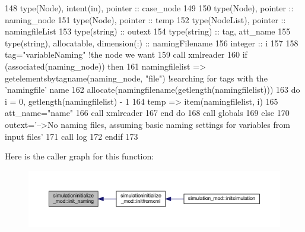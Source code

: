 \begin{DoxyCode}
148     \textcolor{keywordtype}{type}(Node), \textcolor{keywordtype}{intent(in)}, \textcolor{keywordtype}{pointer} :: case\_node
149 
150     \textcolor{keywordtype}{type}(Node), \textcolor{keywordtype}{pointer} :: naming\_node
151     \textcolor{keywordtype}{type}(Node), \textcolor{keywordtype}{pointer} :: temp
152     \textcolor{keywordtype}{type}(NodeList), \textcolor{keywordtype}{pointer} :: namingfileList
153     \textcolor{keywordtype}{type}(string) :: outext
154     \textcolor{keywordtype}{type}(string) :: tag, att\_name
155     \textcolor{keywordtype}{type}(string), \textcolor{keywordtype}{allocatable}, \textcolor{keywordtype}{dimension(:)} :: namingFilename
156     \textcolor{keywordtype}{integer} :: i
157 
158     tag=\textcolor{stringliteral}{"variableNaming"}    \textcolor{comment}{!the node we want}
159     \textcolor{keyword}{call }xmlreader%
160     \textcolor{keywordflow}{if} (\textcolor{keyword}{associated}(naming\_node)) \textcolor{keywordflow}{then}
161         namingfilelist => getelementsbytagname(naming\_node, \textcolor{stringliteral}{"file"})       \textcolor{comment}{!searching for tags with the
       'namingfile' name}
162         \textcolor{keyword}{allocate}(namingfilename(getlength(namingfilelist)))
163         \textcolor{keywordflow}{do} i = 0, getlength(namingfilelist) - 1
164             temp => item(namingfilelist, i)
165             att\_name=\textcolor{stringliteral}{"name"}
166             \textcolor{keyword}{call }xmlreader%
167 \textcolor{keywordflow}{        end do}
168         \textcolor{keyword}{call }globals%
169     \textcolor{keywordflow}{else}
170         outext=\textcolor{stringliteral}{'-->No naming files, assuming basic naming settings for variables from input files'}
171         \textcolor{keyword}{call }log%
172 \textcolor{keywordflow}{    endif}
173 
\end{DoxyCode}
Here is the caller graph for this function\+:\nopagebreak
\begin{figure}[H]
\begin{center}
\leavevmode
\includegraphics[width=350pt]{namespacesimulationinitialize__mod_a4909cc4cb57549e6eed3f69d6dfa30b5_icgraph}
\end{center}
\end{figure}
\mbox{\label{namespacesimulationinitialize__mod_a0b32e8c950fc615198d1e47ba1d36cd6}} 
